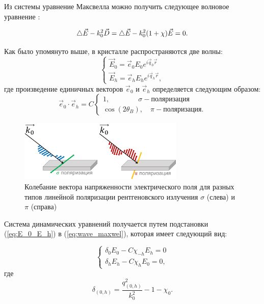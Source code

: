 
 Из системы уравнение Максвелла можно получить следующее волновое уравнение \cite{pinsker1982}:

\begin{equation}
 \mathop{}\!\mathbin\bigtriangleup \vec{E} - k_0^2 \vec{D} = \mathop{}\!\mathbin\bigtriangleup \vec{E} - k_0^2 (1+\chi)\vec{E} = 0.
 \label{eq:wave_maxwel}
\end{equation}

Как было упомянуто выше, в кристалле распространяются две волны:
\begin{equation}
 \begin{cases}
   \vec{E}_0 = \vec{e}_0 E_0 e^{i\vec{q}_0\vec{r}}
   \\
   \vec{E}_h = \vec{e}_h E_h e^{i\vec{q}_h\vec{r}},
 \end{cases}
 \label{eq:E_0_E_h}
\end{equation}
\noindent
где произведение единичных векторов $\vec{e}_0$ и $\vec{e}_h$ определяется следующим образом:
\begin{equation}
\vec{e}_0 \cdot \vec{e}_h = C
 \begin{cases}
   1, \quad \quad \quad \quad  \sigma    - \text{поляризация}\\
   \cos(2\theta_B), \quad   \pi - \text{поляризация}.
 \end{cases}
\end{equation}

\begin{figure}[H]
  \centering
  \includegraphics[width=0.7\textwidth]{images/polarize_E.png}
  \caption{ Колебание вектора напряженности электрического поля для разных типов
  линейной поляризации рентгеновского излучения $\sigma$ (слева) и $\pi$ (справа)}
  \label{ris:polarize_E}
\end{figure}

Система динамических уравнений получается путем подстановки (\ref{eq:E_0_E_h}) в (\ref{eq:wave_maxwel}),
которая имеет следующий вид:

\begin{equation}
 \begin{cases}
   \delta_0 E_0 - C\chi_{-h}E_h=0
   \\
   \delta_h E_h - C\chi_{h}E_0=0,
 \end{cases}
\end{equation}
\noindent
где
\begin{equation}
   \delta_{(0,h)} = \frac{q_{(0,h)}^2}{k_0^2}-1-\chi_0.
\end{equation}


